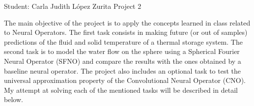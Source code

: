 \documentclass[unicode,11pt,a4paper,oneside,numbers=endperiod,openany]{scrartcl}
\begin{document}
\setassignment
{}

            {Student: Carla Judith L\'opez Zurita}
            {}{Project 2}{}
\newline

The main objective of the project is to apply the concepts learned in class
related to Neural Operators. 
The first task consists in making future (or out of samples) predictions of the fluid and solid
temperature of a thermal storage system. The second task is to model the water
flow on the sphere using a
Spherical Fourier Neural Operator (SFNO) and compare the results with the ones
obtained by a baseline neural operator.
The project also includes an optional task to test the universal approximation
property of the Convolutional Neural Operator (CNO).
My attempt at solving each of the mentioned tasks will be described in detail below.
\end{document}
